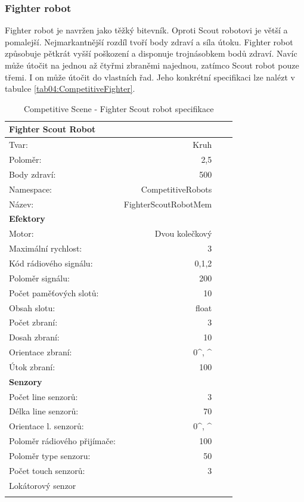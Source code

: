 \subsubsection{Fighter robot}
Fighter robot je navržen jako těžký bitevník. Oproti Scout robotovi je větší a pomalejší. Nejmarkantnější rozdíl tvoří body zdraví a síla útoku. Fighter robot způsobuje pětkrát vyšší poškození a disponuje trojnásobkem bodů zdraví.  Navíc může útočit na jednou až čtyřmi zbraněmi najednou, zatímco Scout robot pouze třemi. I on může útočit do vlastních řad. 
Jeho konkrétní specifikaci lze nalézt v tabulce \ref{tab04:CompetitiveFighter}.
\begin{table}[h]\centering
	\begin{tabular}{l@{\hspace{1.0cm}}D{.}{,}{2.2}D{.}{,}{2.2}D{.}{,}{2.3}}
		\toprule
		\textbf{Fighter Scout Robot} \\
		\midrule
		Tvar: & Kruh\\
		Poloměr: & 2,5\\
		Body zdraví: &500\\
		Namespace: & CompetitiveRobots\\
		Název: & FighterScoutRobotMem \\
		\midrule
		\textbf{Efektory} \\
		\midrule
		Motor: & Dvou kolečkový \\
		Maximální rychlost: & 3 \\
		Kód rádiového signálu: & 0,1,2\\
		Poloměr signálu: & 200\\
		Počet paměťových slotů: &10 \\
		Obsah slotu: & float\\
		Počet zbraní: & 3\\
		Dosah zbraní: & 10\\
		Orientace zbraní: &  0^\circ, ^\circ\\
		Útok zbraní: & 100\\
		\midrule
		\textbf{Senzory} \\
		\midrule
		Počet line senzorů: &  3\\
		Délka line senzorů: & 70\\
		Orientace l. senzorů: & 0^\circ, ^\circ\\
		Poloměr rádiového přijímače: & 100 \\
		Poloměr type senzoru: & 50\\
		Počet touch senzorů: & 3 \\  
		Lokátorový senzor\\ 
		\bottomrule
	\end{tabular}
	\caption{Competitive Scene - Fighter Scout robot specifikace }
	\label{tab04:CompetiveScout}
\end{table}
\clearpage

